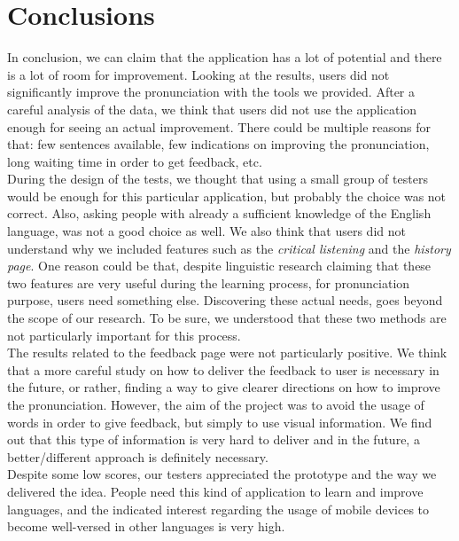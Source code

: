 
\chapter{Conclusions}
\label{chap:Conclusions}

In conclusion, we can claim that the application has a lot of potential and there is a lot of room for improvement. Looking at the results,  users did not significantly improve the pronunciation with the tools we provided. After a careful analysis of the data, we think that users did not use the application enough for seeing an actual improvement. There could be multiple reasons for that: few sentences available, few indications on improving the pronunciation, long waiting time in order to get feedback, etc. \\
\noindent During the design of the tests, we thought that using a small group of testers would be enough for this particular application, but probably the choice was not correct. Also, asking people with already a sufficient knowledge of the English language, was not a good choice as well.
\noindent We also think that users did not understand why we included features such as the \textit{critical listening} and the \textit{history page}. One reason could be that, despite linguistic research claiming that these two features are very useful during the learning process, for pronunciation purpose, users need something else. Discovering these actual needs, goes beyond the scope of our research. To be sure, we understood that these two methods are not particularly important for this process. \\
\noindent The results related to the feedback page were not particularly positive. We think that a more careful study on how to deliver the feedback to user is necessary in the future, or rather, finding a way to give clearer directions on how to improve the pronunciation. However, the aim of the project was to avoid the usage of words in order to give feedback, but simply to use visual information. We find out that this type of information is very hard to deliver and in the future, a better/different approach is definitely necessary. \\

\noindent Despite some low scores, our testers appreciated the prototype and the way we delivered the idea. People need this kind of application to learn and improve languages, and the indicated interest regarding the usage of mobile devices to become well-versed in other languages is very high.
